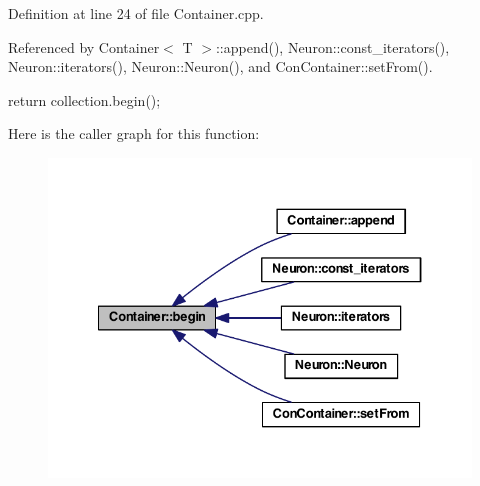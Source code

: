 Definition at line 24 of file Container.cpp.



Referenced by Container$<$ T $>$::append(), Neuron::const\_\-iterators(), Neuron::iterators(), Neuron::Neuron(), and ConContainer::setFrom().


\begin{DoxyCode}
  {
    return collection.begin();
  }
\end{DoxyCode}


Here is the caller graph for this function:
\nopagebreak
\begin{figure}[H]
\begin{center}
\leavevmode
\includegraphics[width=334pt]{class_container_ac5e2a75311f6e6a690ca67603490ddb1_icgraph}
\end{center}
\end{figure}


